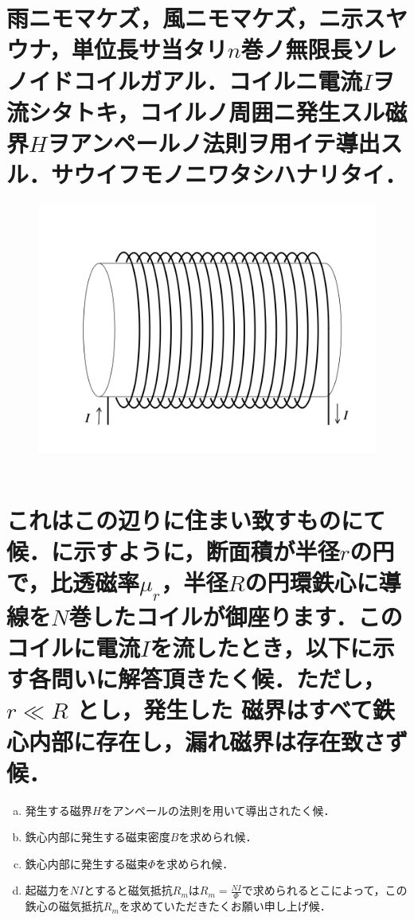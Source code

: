 \documentclass[dvipdfmx]{ujarticle}
\begin{document}
\newpage
\section{雨ニモマケズ，風ニモマケズ，ニ示スヤウナ，単位長サ当タリ$n$巻ノ無限長ソレノイドコイルガアル．コイルニ電流$I$ヲ流シタトキ，コイルノ周囲ニ発生スル磁界$H$ヲアンペールノ法則ヲ用イテ導出スル．サウイフモノニワタシハナリタイ．}

\begin{figure}[h]
	\centering
	\includegraphics[scale=0.35]{./fig/R03_fig2.png}
	\caption{}
	\label{fig:2}
\end{figure}

\begin{align*}
\end{align*}

\newpage
\section{これはこの辺りに住まい致すものにて候．に示すように，断面積が半径$r$の円で，比透磁率$\mu_{r}$，半径$R$の円環鉄心に導線を$N$巻したコイルが御座ります．このコイルに電流$I$を流したとき，以下に示す各問いに解答頂きたく候．ただし，$r \ll R$ とし，発生した 磁界はすべて鉄心内部に存在し，漏れ磁界は存在致さず候．}
\begin{enumerate}[(a)]
	\item 発生する磁界$H$をアンペールの法則を用いて導出されたく候．
	\item 鉄心内部に発生する磁束密度$B$を求められ候．
	\item 鉄心内部に発生する磁束$\Phi$を求められ候．
	\item 起磁力を$NI$とすると磁気抵抗$R_{m}$は$R_{m}=\frac{NI}{\Phi}$で求められるとこによって，この鉄心の磁気抵抗$R_{m}$を求めていただきたくお願い申し上げ候．
\end{enumerate}
\end{document}
